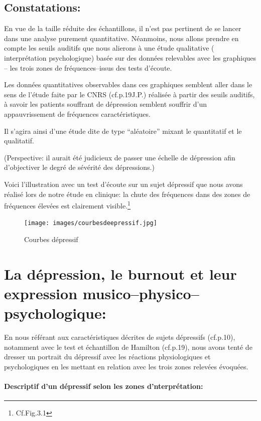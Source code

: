                                              
\subsection{Constatations: }
En vue de la taille réduite des échantillons, il n'est pas
pertinent de se lancer dans une analyse purement
quantitative. Néanmoins, nous 
allons prendre en compte les seuils auditifs que nous  alierons à une étude
qualitative ( interprétation psychologique) basée sur 
des données relevables avec les
graphiques -- les trois zones de fréquences--issus des tests d'écoute.


Les données quantitatives observables dans ces graphiques semblent aller dans le
sens de  l'étude faite par le
CNRS (cf.p.19J.P.) réalisée à partir des seuils auditifs, à savoir
les patients souffrant de dépression semblent souffrir d'un
appauvrissement de fréquences caractéristiques.

Il s'agira  ainsi d'une étude dite de type  ``aléatoire'' mixant le  quantitatif  et le qualitatif.

(Perspective: il aurait été judicieux de passer une échelle de
dépression afin d'objectiver le degré de sévérité des dépressions.)

Voici l'illustration avec un test
d'écoute sur un sujet dépressif que nous avons réalisé lors de notre
étude en clinique: la
chute des fréquences dans des zones de fréquences élevées est
clairement visible.\footnote{Cf.Fig.3.1}
 \begin{figure}
	\centering
	\texttt{[image: images/courbesdeepressif.jpg]}
	\caption{Courbes dépressif}
	\label{fig:courbes du dépressif}
      \end{figure}

  \section{La dépression, le burnout et leur expression
    musico--physico--psychologique:}

  
En nous référant aux
caractéristiques décrites de sujets dépressifs (cf.p.10), notamment avec le test
et échantillon de Hamilton (cf.p.19), nous avons tenté de dresser un portrait
du dépressif avec les réactions physiologiques et psychologiques
  en les mettant en relation avec les trois zones relevées évoquées.

\paragraph{Descriptif d'un dépressif selon les zones d'nterprétation:}



